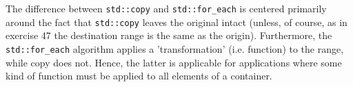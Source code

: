 The difference between \texttt{std::copy} and \texttt{std::for\_each} is centered primarily around the fact that \texttt{std::copy} leaves the original intact (unless, of course, as in exercise 47 the destination range is the same as the origin). Furthermore, the \texttt{std::for\_each} algorithm applies a 'transformation' (i.e. function) to the range, while copy does not. Hence, the latter is applicable for applications where some kind of function must be applied to all elements of a container.
